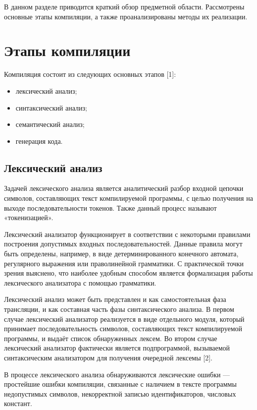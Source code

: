 В данном разделе приводится краткий обзор предметной области.
Рассмотрены основные этапы компиляции, а также проанализированы методы их реализации.

\section{Этапы компиляции}

Компиляция состоит из следующих основных этапов [1]:
\begin{itemize}
	\item лексический анализ;
	\item синтаксический анализ;
	\item семантический анализ;
	\item генерация кода.
\end{itemize}

\subsection{Лексический анализ}

Задачей лексического анализа является аналитический разбор входной цепочки символов, составляющих текст компилируемой программы, с целью получения на выходе последовательности токенов.
Также данный процесс называют «токенизацией».

Лексический анализатор функционирует в соответствии с некоторыми правилами построения допустимых входных последовательностей.
Данные правила могут быть определены, например, в виде детерминированного конечного автомата, регулярного выражения или праволинейной грамматики.
С практической точки зрения выяснено, что наиболее удобным способом является формализация работы лексического анализатора с помощью грамматики.

Лексический анализ может быть представлен и как самостоятельная фаза трансляции, и как составная часть фазы синтаксического анализа.
В первом случае лексический анализатор реализуется в виде отдельного модуля, который принимает последовательность символов, составляющих текст компилируемой программы, и выдаёт список обнаруженных лексем.
Во втором случае лексический анализатор фактически является подпрограммой, вызываемой синтаксическим анализатором для получения очередной лексемы [2].

В процессе лексического анализа обнаруживаются лексические ошибки — простейшие ошибки компиляции, связанные с наличием в тексте программы недопустимых символов, некорректной записью идентификаторов, числовых констант.

